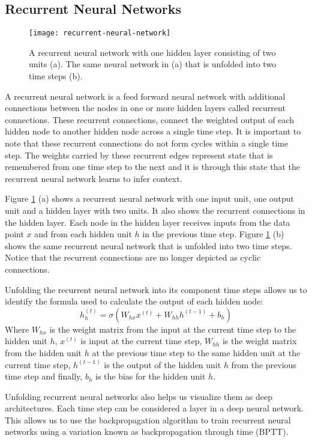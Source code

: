 \subsection{Recurrent Neural Networks} \label{sec:background-sequence-modeling-recurrent-neural-networks}

\begin{figure}[t]
	\centering
	\texttt{[image: recurrent-neural-network]}
	\caption{A recurrent neural network with one hidden layer consisting of two units (a). The same neural network in (a) that is unfolded into two time steps (b)\cite{DBLP:journals/corr/Lipton15}.}
	\label{fig:recurrent-neural-network}
\end{figure}

A recurrent neural network is a feed forward neural network with additional connections between the nodes in one or more hidden layers called recurrent connections. These recurrent connections, connect the weighted output of each hidden node to another hidden node across a single time step. It is important to note that these recurrent connections do not form cycles within a single time step. The weights carried by these recurrent edges represent state that is remembered from one time step to the next and it is through this state that the recurrent neural network learns to infer context\cite{DBLP:journals/corr/Lipton15}.

Figure \ref{fig:recurrent-neural-network} (a) shows a recurrent neural network with one input unit, one output unit and a hidden layer with two units. It also shows the recurrent connections in the hidden layer. Each node in the hidden layer receives inputs from the data point $x$ and from each hidden unit $h$ in the previous time step. Figure \ref{fig:recurrent-neural-network} (b) shows the same recurrent neural network that is unfolded into two time steps. Notice that the recurrent connections are no longer depicted as cyclic connections.

Unfolding the recurrent neural network into its component time steps allows us to identify the formula used to calculate the output of each hidden node:
\begin{equation}
	h_{h}^{(t)} = \sigma(W_{hx} x^{(t)} + W_{hh} h^{(t - 1)} + b_{h})
\end{equation}
Where $W_{hx}$ is the weight matrix from the input at the current time step to the hidden unit $h$, $ x^{(t)}$ is input at the current time step, $W_{hh}$ is the weight matrix from the hidden unit $h$ at the previous time step to the same hidden unit at the current time step, $ h^{(t - 1)}$ is the output of the hidden unit $h$ from the previous time step and finally, $b_{h}$ is the bias for the hidden unit $h$\cite{DBLP:journals/corr/Lipton15}.

Unfolding recurrent neural networks also helps us visualize them as deep architectures. Each time step can be considered a layer in a deep neural network. This allows us to use the backpropagation algorithm to train recurrent neural networks using a variation known as backpropagation through time (BPTT)\cite{DBLP:journals/corr/Lipton15}.